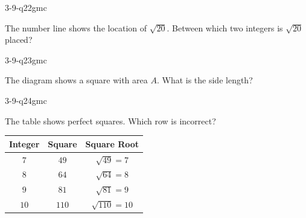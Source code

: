\begin{practiceQuestion}{3-9-q22}{gmc}
\begin{questionText}
The number line shows the location of $\sqrt{20}$. Between which two integers is $\sqrt{20}$ placed?

\begin{center}
\end{center}
\end{questionText}
\end{practiceQuestion}

\begin{practiceQuestion}{3-9-q23}{gmc}
\begin{questionText}
The diagram shows a square with area $A$. What is the side length?

\begin{center}
\end{center}
\end{questionText}
\end{practiceQuestion}

\begin{practiceQuestion}{3-9-q24}{gmc}
\begin{questionText}
The table shows perfect squares. Which row is incorrect?

\begin{center}
\begin{tabular}{|c|c|c|}
\hline
\textbf{Integer} & \textbf{Square} & \textbf{Square Root} \\
\hline
$7$ & $49$ & $\sqrt{49} = 7$ \\ \hline
$8$ & $64$ & $\sqrt{64} = 8$ \\ \hline
$9$ & $81$ & $\sqrt{81} = 9$ \\ \hline
$10$ & $110$ & $\sqrt{110} = 10$ \\ \hline
\end{tabular}
\end{center}
\end{questionText}
\end{practiceQuestion}

